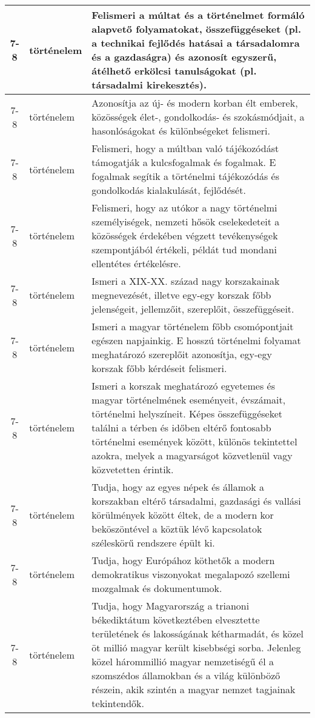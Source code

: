 \begin{small}
\begin{longtable}{c | p{2cm} |  p{11cm} }
              7-8 & történelem & Felismeri a múltat és a történelmet formáló alapvető folyamatokat, összefüggéseket (pl. a technikai fejlődés hatásai a társadalomra és a gazdaságra) és azonosít egyszerű, átélhető erkölcsi tanulságokat (pl. társadalmi kirekesztés). \\ \hline
              7-8 & történelem & Azonosítja az új- és modern korban élt emberek, közösségek élet-, gondolkodás- és szokásmódjait, a hasonlóságokat és különbségeket felismeri.
 \\ \hline
              7-8 & történelem & Felismeri, hogy a múltban való tájékozódást támogatják a kulcsfogalmak és fogalmak. E fogalmak segítik a történelmi tájékozódás és gondolkodás kialakulását, fejlődését. \\ \hline
              7-8 & történelem & Felismeri, hogy az utókor a nagy történelmi személyiségek, nemzeti hősök cselekedeteit a közösségek érdekében végzett tevékenységek szempontjából értékeli, példát tud mondani ellentétes értékelésre. \\ \hline
              7-8 & történelem & Ismeri a XIX-XX. század nagy korszakainak megnevezését, illetve egy-egy korszak főbb jelenségeit, jellemzőit, szereplőit, összefüggéseit. \\ \hline
              7-8 & történelem & Ismeri a magyar történelem főbb csomópontjait egészen napjainkig. E hosszú történelmi folyamat meghatározó szereplőit azonosítja, egy-egy korszak főbb kérdéseit felismeri. \\ \hline
              7-8 & történelem & Ismeri a korszak meghatározó egyetemes és magyar történelmének eseményeit, évszámait, történelmi helyszíneit. Képes összefüggéseket találni a térben és időben eltérő fontosabb történelmi események között, különös tekintettel azokra, melyek a magyarságot közvetlenül vagy közvetetten érintik. \\ \hline
              7-8 & történelem & Tudja, hogy az egyes népek és államok a korszakban eltérő társadalmi, gazdasági és vallási körülmények között éltek, de a modern kor beköszöntével a köztük lévő kapcsolatok széleskörű rendszere épült ki. \\ \hline
              7-8 & történelem & Tudja, hogy Európához köthetők a modern demokratikus viszonyokat megalapozó szellemi mozgalmak és dokumentumok. \\ \hline
              7-8 & történelem & Tudja, hogy Magyarország a trianoni békediktátum következtében elvesztette területének és lakosságának kétharmadát, és közel öt millió magyar került kisebbségi sorba. Jelenleg közel hárommillió magyar nemzetiségű él a szomszédos államokban és a világ különböző részein, akik szintén a magyar nemzet tagjainak tekintendők. \\ \hline

\end{longtable}
\end{small}
